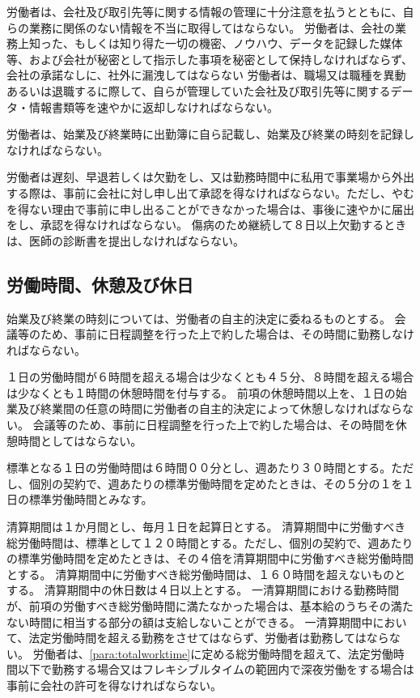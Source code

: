 \documentclass[10pt,a4paper,uplatex]{jsarticle}
\begin{document}
労働者は、会社及び取引先等に関する情報の管理に十分注意を払うとともに、自らの業務に関係のない情報を不当に取得してはならない。
\label{para:confidentiality}
\term
労働者は、会社の業務上知った、もしくは知り得た一切の機密、ノウハウ、データを記録した媒体等、および会社が秘密として指示した事項を秘密として保持しなければならず、会社の承諾なしに、社外に漏洩してはならない
\term
労働者は、職場又は職種を異動あるいは退職するに際して、自らが管理していた会社及び取引先等に関するデータ・情報書類等を速やかに返却しなければならない。

労働者は、始業及び終業時に出勤簿に自ら記載し、始業及び終業の時刻を記録しなければならない。

労働者は遅刻、早退若しくは欠勤をし、又は勤務時間中に私用で事業場から外出する際は、事前に会社に対し申し出て承認を得なければならない。ただし、やむを得ない理由で事前に申し出ることができなかった場合は、事後に速やかに届出をし、承認を得なければならない。
\term
傷病のため継続して８日以上欠勤するときは、医師の診断書を提出しなければならない。




\subsection{労働時間、休憩及び休日}

\label{para:time}
始業及び終業の時刻については、労働者の自主的決定に委ねるものとする。
\term
会議等のため、事前に日程調整を行った上で約した場合は、その時間に勤務しなければならない。

１日の労働時間が６時間を超える場合は少なくとも４５分、８時間を超える場合は少なくとも１時間の休憩時間を付与する。
\term
前項の休憩時間以上を、１日の始業及び終業間の任意の時間に労働者の自主的決定によって休憩しなければならない。
\term
会議等のため、事前に日程調整を行った上で約した場合は、その時間を休憩時間としてはならない。

\label{para:standardworktime}
標準となる１日の労働時間は６時間００分とし、週あたり３０時間とする。ただし、個別の契約で、週あたりの標準労働時間を定めたときは、その５分の１を１日の標準労働時間とみなす。

清算期間は１か月間とし、毎月１日を起算日とする。
\term
清算期間中に労働すべき総労働時間は、標準として１２０時間とする。ただし、個別の契約で、週あたりの標準労働時間を定めたときは、その４倍を清算期間中に労働すべき総労働時間とする。
\term
清算期間中に労働すべき総労働時間は、１６０時間を超えないものとする。
\term
清算期間中の休日数は４日以上とする。
\term
一清算期間における勤務時間が、前項の労働すべき総労働時間に満たなかった場合は、基本給のうちその満たない時間に相当する部分の額は支給しないことができる。
\label{para:totalworktime}
\term
一清算期間中において、法定労働時間を超える勤務をさせてはならず、労働者は勤務してはならない。
\term
労働者は、\ref{para:totalworktime}に定める総労働時間を超えて、法定労働時間以下で勤務する場合又はフレキシブルタイムの範囲内で深夜労働をする場合は事前に会社の許可を得なければならない。
\end{document}
